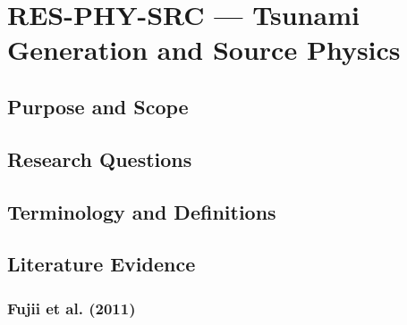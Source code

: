 
\section{RES-PHY-SRC --- Tsunami Generation and Source Physics}
\label{sec:res-phy-src}

\subsection{Purpose and Scope}
\label{sec:res-phy-src-purpose}


\subsection{Research Questions}
\label{sec:res-phy-src-research-questions}


\subsection{Terminology and Definitions}
\label{sec:res-phy-src-definitions}


\subsection{Literature Evidence}
\label{sec:res-phy-src-literature-evidence}

%

\subsubsection{Fujii et al. (2011)}
\label{sec:res-phy-src-evidence-fujii-2011}

